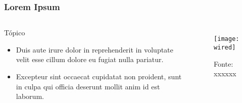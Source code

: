\begin{frame}
    \frametitle{Lorem Ipsum}
    
    \begin{columns}
        \begin{block}{Tópico}
        \begin{itemize}
            \item Duis aute irure dolor in reprehenderit in voluptate velit esse cillum dolore eu fugiat nulla pariatur.\cite{example_article}
        
            \item Excepteur sint occaecat cupidatat non proident, sunt in culpa qui officia deserunt mollit anim id est laborum.
        \end{itemize}
        \end{block}

        \begin{figure}
            \centering \texttt{[image: wired]}
            \caption*{Fonte: xxxxxx}
        \end{figure}
    \end{columns}
\end{frame}
